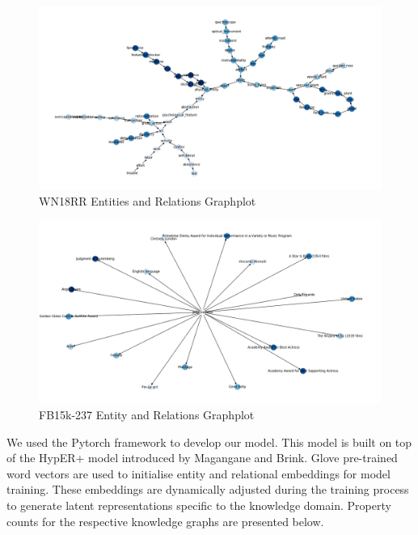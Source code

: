 \begin{figure}[H]
   	\centering
    	\includegraphics[width=\textwidth]{WN18RR_Graph}
	\caption{WN18RR Entities and Relations Graphplot}
\end{figure}

\begin{figure}[H]
   	\centering
    	\includegraphics[width=\textwidth]{FB15k-237_Graph}
	\caption{FB15k-237 Entity and Relations Graphplot}
\end{figure}

\noindent We used the Pytorch framework to develop our model. This model is built on top of the HypER+ model introduced by Magangane and Brink.  Glove pre-trained word vectors are used to initialise entity and relational embeddings for model training. These embeddings are dynamically adjusted during the training process to generate latent representations specific to the knowledge domain. Property counts for the respective knowledge graphs are presented below. \par

